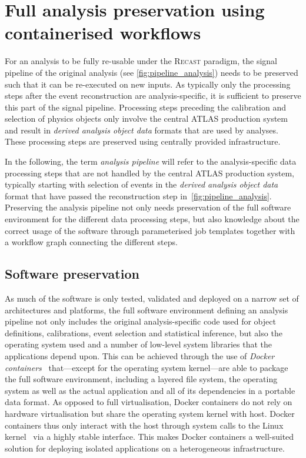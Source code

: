 \section{Full analysis preservation using containerised workflows}\label{sec:recast_implementation}

For an analysis to be fully re-usable under the \textsc{Recast} paradigm, the signal pipeline of the original analysis (see \cref{fig:pipeline_analysis}) needs to be preserved such that it can be re-executed on new inputs. As typically only the processing steps after the event reconstruction are analysis-specific, it is sufficient to preserve this part of the signal pipeline. Processing steps preceding the calibration and selection of physics objects only involve the central ATLAS production system and result in \textit{derived analysis object data} formats that are used by analyses. These processing steps are preserved using centrally provided infrastructure.

   In the following, the term \textit{analysis pipeline} will refer to the analysis-specific data processing steps that are not handled by the central ATLAS production system, typically starting with selection of events in the \textit{derived analysis object data} format that have passed the reconstruction step in~\cref{fig:pipeline_analysis}. Preserving the analysis pipeline not only needs preservation of the full software environment for the different data processing steps, but also knowledge about the correct usage of the software through parameterised job templates together with a workflow graph connecting the different steps.

\subsection{Software preservation}

As much of the software is only tested, validated and deployed on a narrow set of architectures and platforms, the full software environment defining an analysis pipeline not only includes the original analysis-specific code used for object definitions, calibrations, event selection and statistical inference, but also the operating system used and a number of low-level system libraries that the applications depend upon. This can be achieved through the use of \textit{Docker containers}~\cite{docker,Binet:2134524} that---except for the operating system kernel---are able to package the full software environment, including a layered file system, the operating system as well as the actual application and all of its dependencies in a portable data format. As opposed to full virtualisation, Docker containers do not rely on hardware virtualisation but share the operating system kernel with host. Docker containers thus only interact with the host through system calls to the Linux kernel~\cite{ATL-PHYS-PUB-2019-032} via a highly stable interface. This makes Docker containers a well-suited solution for deploying isolated applications on a heterogeneous infrastructure.

